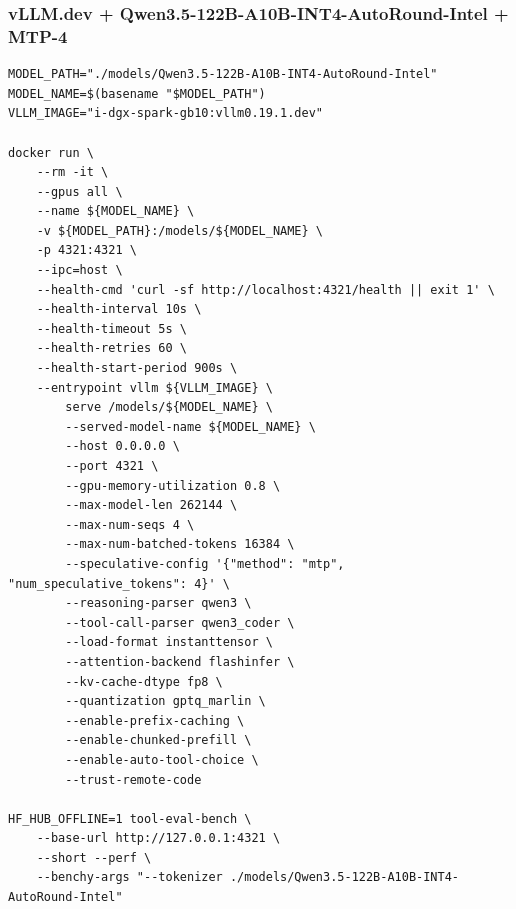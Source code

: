 \documentclass{article}
\begin{document}
\subsubsection{vLLM.dev + Qwen3.5-122B-A10B-INT4-AutoRound-Intel + MTP-4}
\begin{lstlisting}
MODEL_PATH="./models/Qwen3.5-122B-A10B-INT4-AutoRound-Intel"
MODEL_NAME=$(basename "$MODEL_PATH")
VLLM_IMAGE="i-dgx-spark-gb10:vllm0.19.1.dev"

docker run \
    --rm -it \
    --gpus all \
    --name ${MODEL_NAME} \
    -v ${MODEL_PATH}:/models/${MODEL_NAME} \
    -p 4321:4321 \
    --ipc=host \
    --health-cmd 'curl -sf http://localhost:4321/health || exit 1' \
    --health-interval 10s \
    --health-timeout 5s \
    --health-retries 60 \
    --health-start-period 900s \
    --entrypoint vllm ${VLLM_IMAGE} \
        serve /models/${MODEL_NAME} \
        --served-model-name ${MODEL_NAME} \
        --host 0.0.0.0 \
        --port 4321 \
        --gpu-memory-utilization 0.8 \
        --max-model-len 262144 \
        --max-num-seqs 4 \
        --max-num-batched-tokens 16384 \
        --speculative-config '{"method": "mtp", "num_speculative_tokens": 4}' \
        --reasoning-parser qwen3 \
        --tool-call-parser qwen3_coder \
        --load-format instanttensor \
        --attention-backend flashinfer \
        --kv-cache-dtype fp8 \
        --quantization gptq_marlin \
        --enable-prefix-caching \
        --enable-chunked-prefill \
        --enable-auto-tool-choice \
        --trust-remote-code

HF_HUB_OFFLINE=1 tool-eval-bench \
    --base-url http://127.0.0.1:4321 \
    --short --perf \
    --benchy-args "--tokenizer ./models/Qwen3.5-122B-A10B-INT4-AutoRound-Intel"
\end{lstlisting}
\end{document}
